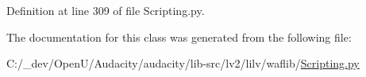 Definition at line 309 of file Scripting.\+py.



The documentation for this class was generated from the following file\+:\begin{DoxyCompactItemize}
\item 
C\+:/\+\_\+dev/\+Open\+U/\+Audacity/audacity/lib-\/src/lv2/lilv/waflib/\hyperlink{lilv_2waflib_2_scripting_8py}{Scripting.\+py}\end{DoxyCompactItemize}
